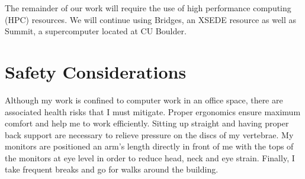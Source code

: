 \documentclass{article}
\begin{document}
  The remainder of our work will require the use of high performance computing (HPC)
  resources. We will continue using Bridges, an XSEDE resource as well as Summit, a
  supercomputer located at CU Boulder.
  
  \section{Safety Considerations}\label{section:safety}
  
  Although my work is confined to computer work in an office space, there are 
  associated health risks that I must mitigate. Proper ergonomics ensure 
  maximum comfort and help me to work efficiently. Sitting up straight and
  having proper back support are necessary to relieve pressure on the discs
  of my vertebrae. My monitors are positioned an arm's length directly in 
  front of me with the tops of the monitors at eye level in order to reduce
  head, neck and eye strain. Finally, I take frequent breaks and go for 
  walks around the building.

  \newpage
  
  
\end{document}
